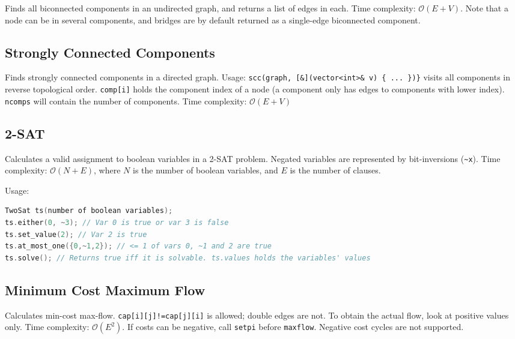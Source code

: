 \documentclass{article}
\begin{document}
Finds all biconnected components in an undirected graph, and returns a list of edges in each. Time complexity: $\mathcal{O}(E + V)$.
Note that a node can be in several components, and bridges are by default returned as a single-edge biconnected component.





\subsection*{Strongly Connected Components}

Finds strongly connected components in a directed graph.
Usage: \lstinline|scc(graph, [&](vector<int>& v) { ... })}| visits all components
in reverse topological order. \texttt{comp[i]} holds the component
index of a node (a component only has edges to components with
lower index). \texttt{ncomps} will contain the number of components.
Time complexity: $\mathcal{O}(E + V)$



\subsection*{2-SAT}

Calculates a valid assignment to boolean variables in a 2-SAT problem.
Negated variables are represented by bit-inversions (\lstinline{~x}).
Time complexity: $\mathcal{O}(N+E)$, where $N$ is the number of boolean variables, and $E$ is the number of clauses.
\begin{multicols}{2}

Usage:
\begin{lstlisting}[language=cpp]
TwoSat ts(number of boolean variables);
ts.either(0, ~3); // Var 0 is true or var 3 is false
ts.set_value(2); // Var 2 is true
ts.at_most_one({0,~1,2}); // <= 1 of vars 0, ~1 and 2 are true
ts.solve(); // Returns true iff it is solvable. ts.values holds the variables' values
\end{lstlisting}
\end{multicols}

\subsection*{Minimum Cost Maximum Flow}

Calculates min-cost max-flow. \lstinline{cap[i][j]!=cap[j][i]} is allowed; double edges are not. To obtain the actual flow, look at positive values only. Time complexity: $\mathcal{O}(E^2)$.
If costs can be negative, call \lstinline{setpi} before \lstinline{maxflow}. Negative cost cycles are not supported.
\end{document}
